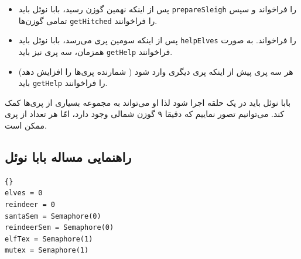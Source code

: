 \documentclass{book}
\newcommand{\clearemptydoublepage}{\newpage\cleardoublepage}
\begin{document}
\begin {itemize}

\item 
    پس از اینکه نهمین گوزن رسید، بابا نوئل باید {\tt prepareSleigh} را فراخواند و سپس تمامی گوزن‌ها  {\tt getHitched} را فراخوانند. 

\item 
    پس از اینکه سومین پری می‌رسد، بابا نوئل باید  {\tt helpElves} را فراخواند. به صورت همزمان، سه پری نیز باید {\tt getHelp} فراخوانند. 

\item 
    هر سه پری پیش از اینکه پری دیگری وارد شود ( شمارنده پری‌ها را افزایش دهد) باید {\tt getHelp} را فراخوانند.

\end {itemize}

    بابا نوئل باید در یک حلقه اجرا شود لذا او می‌تواند به مجموعه بسیاری از پری‌ها کمک کند. می‌توانیم تصور نماییم که دقیقا ۹ گوزن شمالی وجود دارد، امّا 
    هر تعداد از پری ممکن است. 

\clearemptydoublepage
\subsection {راهنمایی مساله بابا نوئل}

\begin{latin}
\begin{latin}
\begin{lstlisting}[title=\rl{راهنمایی مساله بابا نوئل}]{}
elves = 0
reindeer = 0
santaSem = Semaphore(0)
reindeerSem = Semaphore(0)
elfTex = Semaphore(1)
mutex = Semaphore(1)
\end{lstlisting}
\end{latin}
\end{latin}
\end{document}
